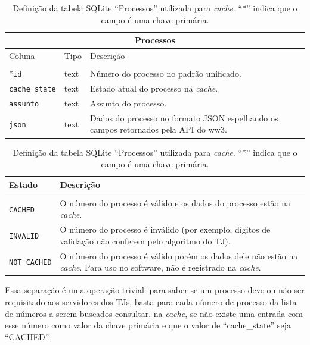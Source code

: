 \begin{table}[htb]
    \small
    \centering
    \begin{tabular}{llp{}}
        \toprule
        \multicolumn{3}{c}{Processos} \\
        \midrule
        Coluna & Tipo & Descrição \\
        \midrule \\
        *\texttt{id} & text & Número do processo no padrão unificado. \\
        \texttt{cache\_state} & text & Estado atual do processo na \textit{cache}. \\
        \texttt{assunto} & text & Assunto do processo. \\
        \texttt{json} & text & Dados do processo no formato JSON espelhando os campos retornados pela API do ww3. \\
        \bottomrule
    \end{tabular}
    \caption{%
        Definição da tabela SQLite ``Processos'' utilizada para \textit{cache}.
        ``*'' indica que o campo é uma chave primária.
    }
    \label{tbl:estrutura-tabela-processos}
\end{table}

\begin{table}[htb]
    \centering
    \begin{tabular}{lp{}}
        \toprule
        Estado & Descrição \\
        \midrule \\
        \texttt{CACHED} & O número do processo é válido e os dados do processo estão na \textit{cache}. \\
        \texttt{INVALID} & O número do processo é inválido (por exemplo, dígitos de validação não conferem pelo algoritmo do TJ). \\
        \texttt{NOT\_CACHED} & O número do processo é válido porém os dados dele não estão na \textit{cache}. Para uso no software, não é registrado na \textit{cache}. \\
        \bottomrule
    \end{tabular}
    \caption{%
        Definição da tabela SQLite ``Processos'' utilizada para \textit{cache}.
        ``*'' indica que o campo é uma chave primária.
    }
    \label{tbl:valores-coluna-state}
\end{table}

Essa separação é uma operação trivial: para saber se um processo deve ou não
ser requisitado aos servidores dos TJs, basta para cada número de processo da
lista de números a serem buscados consultar, na \textit{cache}, se não existe
uma entrada com esse número como valor da chave primária e que o valor de
``cache\_state'' seja ``CACHED''.

